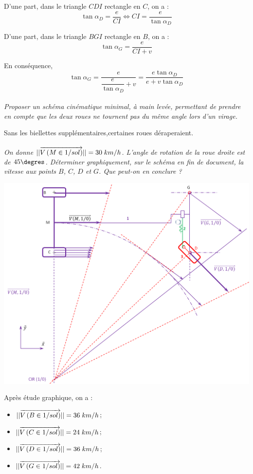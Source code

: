 \documentclass[11pt,oneside]{article}
\begin{document}
D'une part, dans le triangle $CDI$ rectangle en $C$, on a :
$$
\tan\alpha_D = \dfrac{e}{CI} \Longleftrightarrow CI = \dfrac{e}{\tan\alpha_D}
$$

D'une part, dans le triangle $BGI$ rectangle en $B$, on a :
$$
\tan\alpha_G = \dfrac{e}{CI+v}
$$

En conséquence, 
$$
\tan\alpha_G = \dfrac{e}{\dfrac{e}{\tan\alpha_D}+v}=\dfrac{e\tan\alpha_D}{e+v\tan\alpha_D}
$$


\paragraph{}
\textit{Proposer un schéma cinématique minimal, à main levée, permettant de prendre en compte que les deux roues ne tournent pas du même angle lors d'un virage. }

Sans les biellettes supplémentaires,certaines roues déraperaient.

\paragraph{}
\textit{On donne $||\overrightarrow{V\left( {M} \in {1}/{sol}\right)}||=30\; km/h$. L'angle de rotation de la roue droite est de $45\degres$. Déterminer graphiquement, sur le schéma en fin de document, la vitesse aux points $B$, $C$, $D$ et $G$. Que peut-on en conclure ?}

\begin{center}
\includegraphics[width=.9\textwidth]{png/cin_graph}
\end{center}

Après étude graphique, on a :
\begin{itemize}
\item $||\overrightarrow{V\left( {B} \in {1}/{sol}\right)}||= 36\; km/h$;
\item $||\overrightarrow{V\left( {C} \in {1}/{sol}\right)}||= 24\; km/h$;
\item $||\overrightarrow{V\left( {D} \in {1}/{sol}\right)}||= 36\; km/h$;
\item $||\overrightarrow{V\left( {G} \in {1}/{sol}\right)}||= 42\; km/h$.
\end{itemize}
\end{document}

